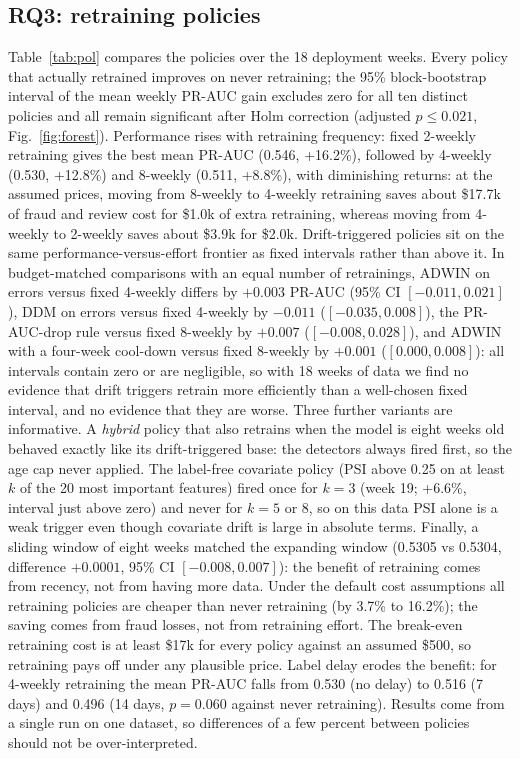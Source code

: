 \documentclass[conference]{IEEEtran}
\begin{document}
\subsection{RQ3: retraining policies}
Table~\ref{tab:pol} compares the policies over the 18 deployment weeks. Every policy that actually retrained improves on never retraining; the 95\% block-bootstrap interval of the
mean weekly PR-AUC gain excludes zero for all ten distinct policies and all remain significant after Holm correction (adjusted $p\le0.021$, Fig.~\ref{fig:forest}). Performance rises with retraining frequency:
fixed 2-weekly retraining gives the best mean PR-AUC (0.546, +16.2\%), followed by 4-weekly (0.530, +12.8\%) and 8-weekly (0.511, +8.8\%), with diminishing returns:
at the assumed prices, moving from 8-weekly to 4-weekly retraining saves about \$17.7k of fraud and review cost for \$1.0k of extra retraining, whereas moving from 4-weekly to 2-weekly saves about \$3.9k for \$2.0k.
Drift-triggered policies sit on the same performance-versus-effort frontier as fixed intervals rather than above it. In budget-matched comparisons with an equal number of retrainings,
ADWIN on errors versus fixed 4-weekly differs by $+0.003$ PR-AUC (95\% CI $[-0.011,0.021]$), DDM on errors versus fixed 4-weekly by $-0.011$ ($[-0.035,0.008]$), the PR-AUC-drop rule versus fixed 8-weekly by $+0.007$ ($[-0.008,0.028]$),
and ADWIN with a four-week cool-down versus fixed 8-weekly by $+0.001$ ($[0.000,0.008]$):
all intervals contain zero or are negligible, so with 18 weeks of data we find no evidence that drift triggers retrain more efficiently than a well-chosen fixed interval, and no evidence that they are worse.
Three further variants are informative. A \emph{hybrid} policy that also retrains when the model is eight weeks old behaved exactly like its drift-triggered base: the detectors always fired first, so the age cap never applied.
The label-free covariate policy (PSI above 0.25 on at least $k$ of the 20 most important features) fired once for $k=3$ (week 19; +6.6\%, interval just above zero) and never for $k=5$ or $8$, so on this data PSI alone is a weak trigger even though covariate drift is large in absolute terms.
Finally, a sliding window of eight weeks matched the expanding window (0.5305 vs 0.5304, difference $+0.0001$, 95\% CI $[-0.008,0.007]$): the benefit of retraining comes from recency, not from having more data.
Under the default cost assumptions all retraining policies are cheaper than never retraining (by 3.7\% to 16.2\%); the saving comes from fraud losses, not from retraining effort. The break-even retraining cost is
at least \$17k for every policy against an assumed \$500, so retraining pays off under any plausible price. Label delay erodes the benefit:
for 4-weekly retraining the mean PR-AUC falls from 0.530 (no delay) to 0.516 (7 days) and 0.496 (14 days, $p=0.060$ against never retraining).
Results come from a single run on one dataset, so differences of a few percent between policies should not be over-interpreted.
\end{document}
